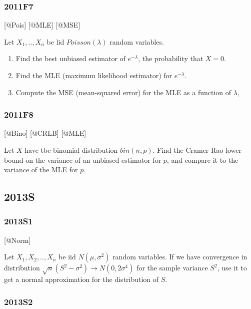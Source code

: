 \documentclass[6pt,twocolumn,Portrait]{article}
\begin{document}
\hypertarget{f7-4}{%
\subsubsection{2011F7}\label{f7-4}}

{[}@Pois{]} {[}@MLE{]} {[}@MSE{]}

Let \(X_1,..,X_{n}\) be lid \(Poisson(\lambda)\) random variables.

\begin{enumerate}
\def\labelenumi{(\alph{enumi})}
\item
  Find the best unbiased estimator of \(e^{-\lambda}\), the probability
  that \(X=0\).
\item
  Find the MLE (maximum likelihood estimator) for \(e^{-\lambda}\).
\item
  Compute the MSE (mean-squared error) for the MLE as a function of
  \(\lambda\),
\end{enumerate}

\hypertarget{f8-3}{%
\subsubsection{2011F8}\label{f8-3}}

{[}@Bino{]} {[}@CRLB{]} {[}@MLE{]}

Let \(X\) have tbe binomial distribution \(bin(n,p)\). Find the
Cramer-Rao lower bound on the variance of an unbiased estimator for
\(p\), and compare it to the variance of the MLE for \(p\).

\hypertarget{s-6}{%
\subsection{2013S}\label{s-6}}

\hypertarget{s1-3}{%
\subsubsection{2013S1}\label{s1-3}}

{[}@Norm{]}\protect\hyperlink{section}{}

Let \(X_1,X_2,..,X_{n}\) be iid \(N(\mu,\sigma^2)\) random variables. If
we have convergence in distribution
\(\sqrt{n}(S^2-\sigma^2)\to N(0,2\sigma^4)\) for the sample variance
\(S^2\), use it to get a normal approximation for the distribution of
\(S\).

\hypertarget{s2-3}{%
\subsubsection{2013S2}\label{s2-3}}
\end{document}

